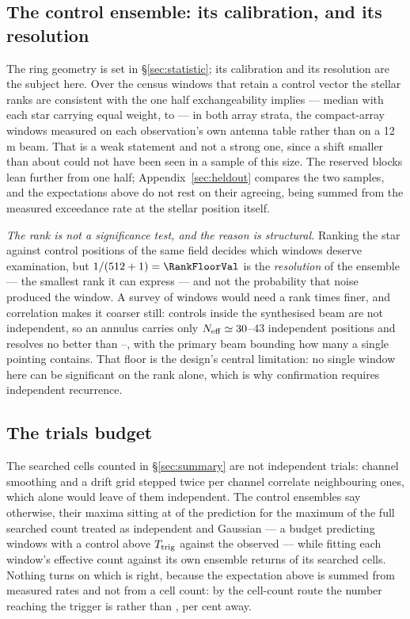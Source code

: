 \subsection{The control ensemble: its calibration, and its resolution}

The ring geometry is set in \S\ref{sec:statistic}; its calibration and its
resolution are the subject here. Over the \VerNTested{} census windows that
retain a control vector the stellar ranks are consistent with the one half
exchangeability implies --- median \BkRankBalSurv{} with each star carrying
equal weight, \BkRankBalSurvLo{} to \BkRankBalSurvHi{} --- in both array
strata, the compact-array windows measured on each observation's own antenna
table rather than on a 12\,m beam. That is a weak statement and not a strong
one, since a shift smaller than about \VerKsPowerAca{} could not have been
seen in a sample of this size. The reserved blocks lean further from one half;
Appendix~\ref{sec:heldout} compares the two samples, and the expectations
above do not rest on their agreeing, being summed from the measured
exceedance rate at the stellar position itself.

\emph{The rank is not a significance test, and the reason is structural.}
Ranking the star against \NCtrl{} control positions of the same field decides
which windows deserve examination, but $1/(\NCtrl+1)=\RankFloorVal$ is the
\emph{resolution} of the ensemble --- the smallest rank it can express --- and
not the probability that noise produced the window. A survey of \NWindows{}
windows would need a rank \BonfRankRatio{} times finer, and correlation makes
it coarser still: controls inside the synthesised beam are not independent, so
an annulus carries only $N_{\rm eff}\simeq30$--$43$ independent positions and
resolves no better than \RankEffLo--\RankEffHi, with the primary beam
bounding how many a single pointing contains. That floor is the design's
central limitation: no single window here can be significant on the rank
alone, which is why confirmation requires independent recurrence.

\subsection{The trials budget}

The searched cells counted in \S\ref{sec:summary} are not independent
trials: channel smoothing and a drift grid stepped twice per channel
correlate neighbouring ones, which alone would leave \StGridFrac{} of them
independent. The control ensembles say otherwise, their maxima sitting at
\CtrlMaxRatioMed{} of the prediction for the maximum of the full searched
count treated as independent and Gaussian --- a budget predicting
\NCtrlWinExp{} windows with a control above $T_{\rm trig}$ against the
\NCtrlWinObs{} observed --- while fitting each window's effective count
against its own ensemble returns \StNindFrac{} of its searched cells. Nothing
turns on which is right, because the expectation above is summed from measured
rates and not from a cell count: by the cell-count route the number reaching
the trigger is \StExpModel{} rather than \CeExpTrig, \StModelAgreePct{} per
cent away.

